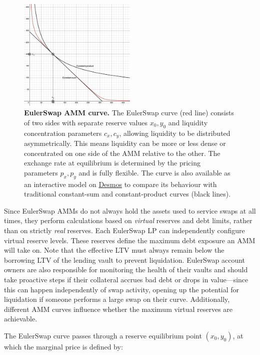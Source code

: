 \documentclass{article}
\begin{document}
\begin{figure}[h]
\centering
\includegraphics[width=0.5\textwidth]{curve.png}
\caption{\textbf{EulerSwap AMM curve.} The EulerSwap curve (red line) consists of two sides with separate reserve values $x_0, y_0$ and liquidity concentration parameters $c_x, c_y$, allowing liquidity to be distributed asymmetrically. This means liquidity can be more or less dense or concentrated on one side of the AMM relative to the other. The exchange rate at equilibrium is determined by the pricing parameters $p_x, p_y$ and is fully flexible. The curve is also available as an interactive model on \href{https://www.desmos.com/calculator/iczoxr4mhw}{Desmos} to compare its behaviour with traditional constant-sum and constant-product curves (black lines).}
\label{fig:fig1}
\end{figure}

Since EulerSwap AMMs do not always hold the assets used to service swaps at all times, they perform calculations based on \emph{virtual} reserves and debt limits, rather than on strictly \emph{real} reserves. Each EulerSwap LP can independently configure virtual reserve levels. These reserves define the maximum debt exposure an AMM will take on. Note that the effective LTV must always remain below the borrowing LTV of the lending vault to prevent liquidation. EulerSwap account owners are also responsible for monitoring the health of their vaults and should take proactive steps if their collateral accrues bad debt or drops in value—since this can happen independently of swap activity, opening up the potential for liquidation if someone performs a large swap on their curve. Additionally, different AMM curves influence whether the maximum virtual reserves are achievable.

The EulerSwap curve passes through a reserve equilibrium point $(x_0, y_0)$, at which the marginal price is defined by:
\end{document}
